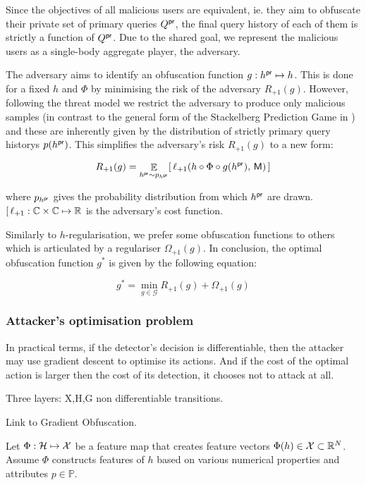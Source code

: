 Since the objectives of all malicious users are equivalent, ie. they aim
to obfuscate their private set of primary queries $\pr{Q}$, the final
query history of each of them is strictly a function of $\pr{Q}$. Due
to the shared goal, we represent the malicious users as a single-body
aggregate player, the adversary.

The adversary aims to identify an obfuscation function
$g: \pr{h} \mapsto h$. This is done for a fixed $h$ and $\Phi$
by minimising the risk of the adversary $R_{+1}(g)$. However,
following the threat model we restrict the adversary to produce only
malicious samples (in contrast to the general form of the Stackelberg
Prediction Game in \cite{stackelberg_games}) and these are inherently given by
the distribution of strictly primary query historys $p(\pr{h})$.
This simplifies the adversary’s risk $R_{+1}(g)$ to a new form:

\begin{equation}
R_{+1}(g) = \E_{ \pr{h} \sim p_{\pr{h}} } \left \ell_{+1}(h \circ \Phi \circ g (\pr{h}), \, \mathsf{M} ) \right
\end{equation}

where $p_{\pr{h}}$ gives the probability distribution from which
$\pr{h}$ are drawn.
$\left \ell_{+1}: \mathbb{C} \times \mathbb{C} \mapsto \mathbb{R}$ is
the adversary’s cost function.

Similarly to $h$-regularisation, we prefer some obfuscation functions
to others which is articulated by a regulariser $\Omega_{+1}(g)$. In
conclusion, the optimal obfuscation function $g^*$ is given by the
following equation:

\begin{equation}
g^* = \min_{g \in \mathcal{G}} R_{+1}(g) + \Omega_{+1}(g)
\end{equation}

\subsubsection{Attacker's optimisation problem}
In practical terms, if the detector's decision is differentiable, then the attacker may use gradient descent to optimise its actions. And if the cost of the optimal action is larger then the cost of its detection, it chooses not to attack at all.

Three layers: X,H,G non differentiable transitions.

Link to Gradient Obfuscation.

Let $\Phi: \H \mapsto \X$ be a feature map that creates feature vectors $\Phi(h) \in \X \subset \R^N$. Assume $\Phi$ constructs features of $h$ based on various numerical properties and attributes $p \in \mathbb{P}$.

